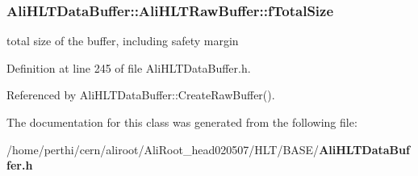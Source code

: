 \subsubsection{ {\bf Ali\-HLTData\-Buffer::Ali\-HLTRaw\-Buffer::f\-Total\-Size}\hspace{0.3cm}{\tt  [private]}}\label{classAliHLTDataBuffer_1_1AliHLTRawBuffer_r1}


total size of the buffer, including safety margin 

Definition at line 245 of file Ali\-HLTData\-Buffer.h.

Referenced by Ali\-HLTData\-Buffer::Create\-Raw\-Buffer().

The documentation for this class was generated from the following file:\begin{CompactItemize}
\item 
/home/perthi/cern/aliroot/Ali\-Root\_\-head020507/HLT/BASE/{\bf Ali\-HLTData\-Buffer.h}\end{CompactItemize}
